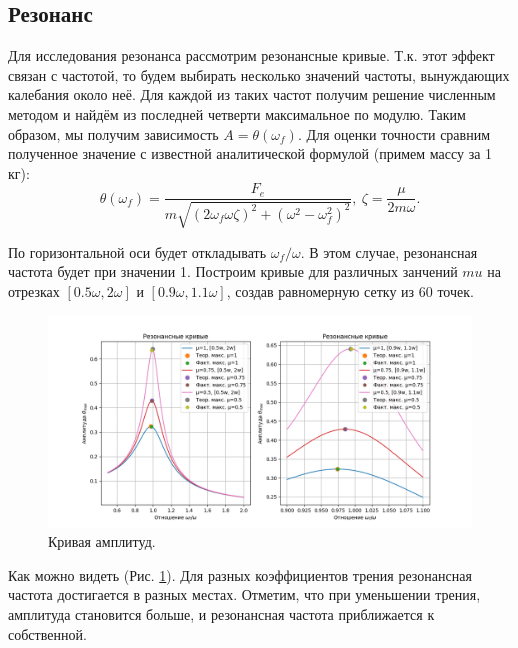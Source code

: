 \subsection*{Резонанс}
Для исследования резонанса рассмотрим резонансные кривые. Т.к. этот эффект связан с частотой, то будем выбирать несколько значений частоты, вынуждающих калебания около неё. Для каждой из таких частот получим решение численным методом и найдём из последней четверти максимальное по модулю. Таким образом, мы получим зависимость $A=\theta(\omega_f)$. Для оценки точности сравним полученное значение с известной аналитической формулой\cite{feinman} (примем массу за 1 кг):
\begin{equation}
	\theta(\omega_f) = \frac{F_e}{m \sqrt{(2\omega_f \omega \zeta)^2 + (\omega ^ 2 - \omega_f^2)^2}}, \ \zeta = \frac{\mu}{2m\omega}.
\end{equation}

По горизонтальной оси будет откладывать $\omega_f / \omega$. В этом случае, резонансная частота будет при значении 1. Построим кривые для различных занчений $mu$ на отрезках $[0.5\omega, 2\omega]$ и $[0.9\omega, 1.1\omega]$, создав равномерную сетку из 60 точек.

\begin{figure}[h]  %
	\centering
	\includegraphics[width=1\textwidth]{imgs/res.png}  %
	\caption{Кривая амплитуд.}  %
	\label{fig:res}  %
\end{figure}

Как можно видеть (Рис. \ref{fig:res}). Для разных коэффициентов трения резонансная частота достигается в разных местах. Отметим, что при уменьшении трения, амплитуда становится больше, и резонансная частота приближается к собственной. 


